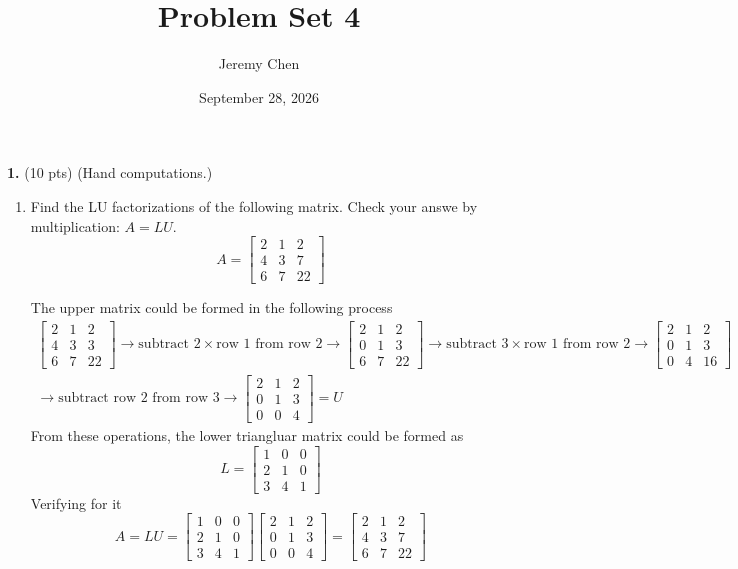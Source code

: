 \documentclass[10pt,letterpaper]{article}
\title{Problem Set 4}
\author{Jeremy Chen}
\date{September 28, 2026}
\begin{document}
	\maketitle

\noindent\textbf{1. }(10 pts) (Hand computations.)

\begin{enumerate}

\item Find the LU factorizations of the following matrix. Check your answe by multiplication: $A = LU$.
$$A = \begin{bmatrix}
2 & 1 & 2 \\
4 & 3 & 7 \\
6 & 7 & 22 
\end{bmatrix}$$

\color{TangGreen}
The upper matrix could be formed in the following process
\begin{gather*}
\begin{bmatrix}
2 & 1 & 2 \\
4 & 3 & 3 \\
6 & 7 & 22
\end{bmatrix} \rightarrow \text{subtract } 2 \times \text{row 1 from row 2} \rightarrow \begin{bmatrix}
2 & 1 & 2 \\
0 & 1 & 3 \\
6  & 7 & 22 
\end{bmatrix} \rightarrow \text{subtract }3 \times \text{row 1 from row 2} \rightarrow \begin{bmatrix}
2 & 1 & 2 \\
0 & 1 & 3 \\
0 & 4 & 16 
\end{bmatrix} \\
\rightarrow \text{subtract row 2 from row 3} \rightarrow \begin{bmatrix}
2 & 1 & 2 \\
0 & 1 & 3 \\
0 & 0 & 4
\end{bmatrix} = U
\end{gather*}
From these operations, the lower triangluar matrix could be formed as 
$$L = \begin{bmatrix}
1 & 0 & 0 \\
2 & 1 & 0 \\
3 & 4 & 1 
\end{bmatrix}$$
Verifying for it
$$A = LU = \begin{bmatrix}
1 & 0 & 0 \\
2 & 1 & 0 \\
3 & 4  & 1 
\end{bmatrix}\begin{bmatrix}
2 & 1 & 2 \\
0 & 1 & 3 \\
0 & 0 & 4 
\end{bmatrix} = \begin{bmatrix}
2 & 1 & 2 \\
4 & 3 & 7 \\
6 & 7 & 22 
\end{bmatrix}$$
\color{black}


\end{enumerate}
\end{document}
